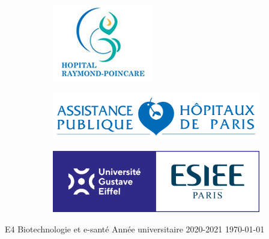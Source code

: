 \documentclass [11pt]{article}
\begin{document}
\begin{titlepage}
\begin{figure}[!h]
\centering
    \begin{subfigure}[h]{0.25\textwidth}
   \includegraphics[width=\textwidth]{hopital.png} 
    \end{subfigure}
     \begin{subfigure}[h]{0.25\textwidth}
     \includegraphics[width=\textwidth]{APHP.png} 
    \end{subfigure}
      \begin{subfigure}[h]{0.25\textwidth}
      \includegraphics[width=\textwidth]{UGE-ESIEE.png} 
    \end{subfigure}
\end{figure}

       

       \vfill
            

            
       \vspace{0.8cm}
     
   
            
     
       \large E4 Biotechnologie et e-santé \linebreak
\normalsize Année universitaire 2020-2021 \linebreak
       \today
            
   
\end{titlepage}
\end{document}
